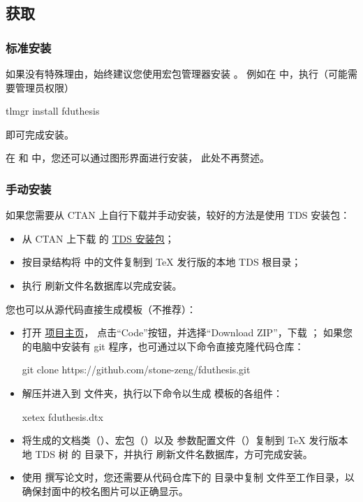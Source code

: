 \documentclass{ccnudoc}
\begin{document}
\subsection{获取 }

\subsubsection{标准安装}

如果没有特殊理由，始终建议您使用宏包管理器安装 。
例如在 \TeXLive{} 中，执行（可能需要管理员权限）
\begin{shellexample}[morekeywords={tlmgr,install}]
  tlmgr install fduthesis
\end{shellexample}
即可完成安装。

在 \TeXLive{} 和 \MiKTeX{} 中，您还可以通过图形界面进行安装，
此处不再赘述。

\subsubsection{手动安装}

如果您需要从 CTAN 上自行下载并手动安装，较好的方法是使用 TDS
安装包：
\begin{itemize}
  \item 从 CTAN 上下载  的
    \href{http://mirror.ctan.org/install/macros/latex/contrib/fduthesis.tds.zip}{TDS 安装包}；
  \item 按目录结构将  中的文件复制到 \TeX{}
    发行版的本地 TDS 根目录；
  \item 执行  刷新文件名数据库以完成安装。
\end{itemize}
%
您也可以从源代码直接生成模板（不推荐）：
\begin{itemize}
  \item 打开 \href{https://github.com/stone-zeng/fduthesis}{项目主页}，
    点击“Code”按钮，并选择“Download ZIP”，下载 ；
    如果您的电脑中安装有 git 程序，也可通过以下命令直接克隆代码仓库：
    \begin{shellexample}[gobble=7,alsoletter={.},morekeywords={git,clone}]
      git clone https://github.com/stone-zeng/fduthesis.git
    \end{shellexample}
  \item 解压并进入到  文件夹，执行以下命令以生成
    模板的各组件：
    \begin{shellexample}[gobble=7,morekeywords={xetex}]
      xetex fduthesis.dtx
    \end{shellexample}
  \item 将生成的文档类（）、宏包（）以及
    参数配置文件（）复制到 \TeX{} 发行版本地 TDS 树
    的  目录下，并执行
     刷新文件名数据库，方可完成安装。
  \item 使用  撰写论文时，您还需要从代码仓库下的
     目录中复制 
    文件至工作目录，以确保封面中的校名图片可以正确显示。
\end{itemize}
\end{document}
